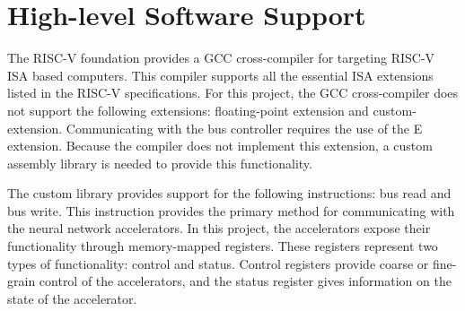 \documentclass[../main.tex]{subfiles}
\begin{document}
\section{High-level Software Support}
\label{sec:software-support}
The RISC-V foundation provides a GCC cross-compiler for targeting RISC-V ISA based computers. This compiler supports all the essential ISA extensions listed in the RISC-V specifications\cite{RISC-V-isa}. For this project, the GCC cross-compiler does not support the following extensions: floating-point extension and custom-extension. Communicating with the bus controller requires the use of the E extension. Because the compiler does not implement this extension, a custom assembly library is needed to provide this functionality.  

The custom library provides support for the following instructions: bus read and bus write. This instruction provides the primary method for communicating with the neural network accelerators.  In this project, the accelerators expose their functionality through memory-mapped registers. These registers represent two types of functionality: control and status. Control registers provide coarse or fine-grain control of the accelerators, and the status register gives information on the state of the accelerator. 
\end{document}
